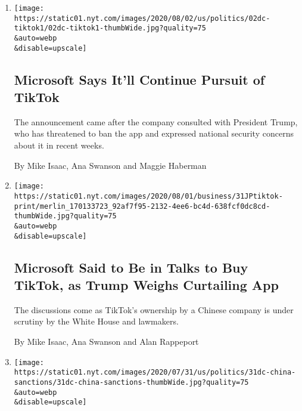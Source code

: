 \begin{enumerate}
\def\labelenumi{\arabic{enumi}.}
\item
  \href{/2020/08/02/business/economy/trump-tiktok-china-national-security.html}{}

  \texttt{[image: https://static01.nyt.com/images/2020/08/02/us/politics/02dc-tiktok1/02dc-tiktok1-thumbWide.jpg?quality=75\\\&auto=webp\\\&disable=upscale]}

  \hypertarget{microsoft-says-itll-continue-pursuit-of-tiktok}{%
  \subsection{Microsoft Says It'll Continue Pursuit of
  TikTok}\label{microsoft-says-itll-continue-pursuit-of-tiktok}}

  The announcement came after the company consulted with President
  Trump, who has threatened to ban the app and expressed national
  security concerns about it in recent weeks.

  By Mike Isaac, Ana Swanson and Maggie Haberman
\item
  \href{/2020/07/31/technology/tiktok-microsoft.html}{}

  \texttt{[image: https://static01.nyt.com/images/2020/08/01/business/31JPtiktok-print/merlin\_170133723\_92af7f95-2132-4ee6-bc4d-638fcf0dc8cd-thumbWide.jpg?quality=75\\\&auto=webp\\\&disable=upscale]}

  \hypertarget{microsoft-said-to-be-in-talks-to-buy-tiktok-as-trump-weighs-curtailing-app}{%
  \subsection{Microsoft Said to Be in Talks to Buy TikTok, as Trump
  Weighs Curtailing
  App}\label{microsoft-said-to-be-in-talks-to-buy-tiktok-as-trump-weighs-curtailing-app}}

  The discussions come as TikTok's ownership by a Chinese company is
  under scrutiny by the White House and lawmakers.

  By Mike Isaac, Ana Swanson and Alan Rappeport
\item
  \href{/2020/07/31/us/politics/sanctions-china-xinjiang-uighurs.html}{}

  \texttt{[image: https://static01.nyt.com/images/2020/07/31/us/politics/31dc-china-sanctions/31dc-china-sanctions-thumbWide.jpg?quality=75\\\&auto=webp\\\&disable=upscale]}

  \hypertarget{us-adds-sanctions-over-internment-of-muslims-in-china}{%
}
\end{enumerate}
